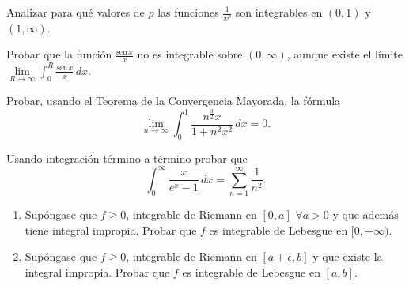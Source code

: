 \documentclass{book}
\begin{document}
\begin{ejer}{}
  Analizar para qu\'e valores de $p$ las funciones $\frac{1}{x^p}$ son integrables en $(0,1)$ y $(1,\infty)$.
	\end{ejer}
  
	\begin{ejer}{} 
	Probar que la función $\frac{\text{sen}\,x}{x}$ no es integrable sobre $(0,\infty)$, aunque existe el límite
\linebreak  $\lim\limits_{R\rightarrow \infty}\int_0^R \frac{\text{sen}\,x}{x}\,dx.$
\end{ejer}
	

	
	
	\begin{ejer}{}
	Probar, usando el Teorema de la Convergencia Mayorada, la fórmula
  $$\lim\limits_{n\rightarrow \infty} \int_0^1 \frac{n^{\frac{3}{2}} x}{1+n^2 x^2}\,dx=0. $$
	\end{ejer}


  \begin{ejer}{}
	Usando integración término a término probar que 
  $$\int_0^{\infty} \frac{x}{e^x-1}\,dx=\sum_{n=1}^{\infty}\frac{1}{n^2}. $$
  \end{ejer}
	
	\begin{ejer}{}
	\begin{enumerate}
	\item Sup\'ongase que $f\geq 0$, integrable de Riemann en $[0,a]$ $\forall a>0$ y que adem\'as tiene integral impropia. 
	Probar que $f$ es integrable de Lebesgue en $[0,+\infty)$.
	\item Sup\'ongase que $f\geq 0$, integrable de Riemann en $[a+\epsilon,b]$ y que existe la integral impropia.
	Probar que $f$ es integrable de Lebesgue en $[a,b]$.
	\end{enumerate}
	\end{ejer}
	
\end{document}
